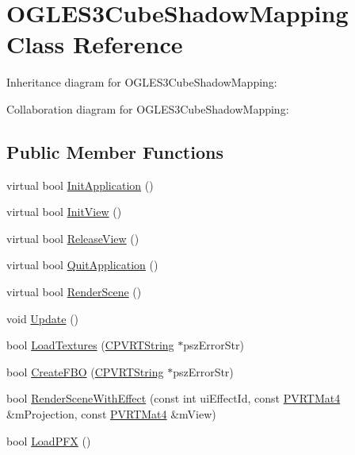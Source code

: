 \hypertarget{class_o_g_l_e_s3_cube_shadow_mapping}{\section{O\+G\+L\+E\+S3\+Cube\+Shadow\+Mapping Class Reference}
\label{class_o_g_l_e_s3_cube_shadow_mapping}
}


Inheritance diagram for O\+G\+L\+E\+S3\+Cube\+Shadow\+Mapping\+:


Collaboration diagram for O\+G\+L\+E\+S3\+Cube\+Shadow\+Mapping\+:
\subsection*{Public Member Functions}
\begin{DoxyCompactItemize}
\item 
virtual bool \hyperlink{class_o_g_l_e_s3_cube_shadow_mapping_a94ae588597bfa02e8daf5e9aa169192c}{Init\+Application} ()
\item 
virtual bool \hyperlink{class_o_g_l_e_s3_cube_shadow_mapping_a9d85a23ec2a75cc219a972e4e61b9bac}{Init\+View} ()
\item 
virtual bool \hyperlink{class_o_g_l_e_s3_cube_shadow_mapping_abd8e5bf01a7d1aeb2248e5f3fbab7b9e}{Release\+View} ()
\item 
virtual bool \hyperlink{class_o_g_l_e_s3_cube_shadow_mapping_aa85150e70e932b50b2b1f6f0ae9aa494}{Quit\+Application} ()
\item 
virtual bool \hyperlink{class_o_g_l_e_s3_cube_shadow_mapping_a50a81ba795876d9992655ac6f02019d6}{Render\+Scene} ()
\item 
void \hyperlink{class_o_g_l_e_s3_cube_shadow_mapping_ad2fee38498e5bcc85f00b6a5b281017c}{Update} ()
\item 
bool \hyperlink{class_o_g_l_e_s3_cube_shadow_mapping_a7735d22a0a4be08964c81cf9680f1367}{Load\+Textures} (\hyperlink{class_c_p_v_r_t_string}{C\+P\+V\+R\+T\+String} $\ast$psz\+Error\+Str)
\item 
bool \hyperlink{class_o_g_l_e_s3_cube_shadow_mapping_a1ef26a0f0e6ae9ca8756dedcc965d7d7}{Create\+F\+B\+O} (\hyperlink{class_c_p_v_r_t_string}{C\+P\+V\+R\+T\+String} $\ast$psz\+Error\+Str)
\item 
bool \hyperlink{class_o_g_l_e_s3_cube_shadow_mapping_a73663c9008ff01f8852905b5ac0ea711}{Render\+Scene\+With\+Effect} (const int ui\+Effect\+Id, const \hyperlink{struct_p_v_r_t_mat4}{P\+V\+R\+T\+Mat4} \&m\+Projection, const \hyperlink{struct_p_v_r_t_mat4}{P\+V\+R\+T\+Mat4} \&m\+View)
\item 
bool \hyperlink{class_o_g_l_e_s3_cube_shadow_mapping_a9aa68eba08789f0b5a5a873fefecb0a9}{Load\+P\+F\+X} ()
\end{DoxyCompactItemize}


